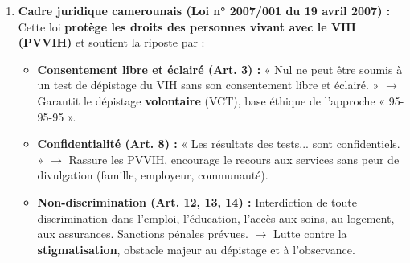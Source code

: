 \documentclass[11pt]{article}
\begin{document}
\begin{corrige}
\begin{enumerate}
\begin{enumerate}
\item \textbf{Dépistage communautaire et auto-test VIH (VIHAT) :} Déployer des \textbf{équipes mobiles} et \textbf{pairs-éducateurs} dans les lieux de vie des populations clés (HSH, travailleurs du sexe, usagers de drogues, jeunes, hommes) et zones rurales mal desservies. Proposer l'\textbf{auto-test VIH} (OraQuick, test salivaire) : confidentiel, non invasif, résultat en 20 min, réalisé par la personne elle-même. Cela lève les freins : stigmatisation en structure de santé, distance géographique, horaires incompatibles, peur du jugement. \emph{Preuve :} Projets ATLAS, STAR en Afrique subsaharienne ont doublé le taux de dépistage chez les hommes et populations clés.
\item \textbf{Dépistage index (partner notification) optimisé et linkage immédiat :} Pour \textbf{chaque nouveau cas diagnostiqué} au CTA, proposer systématiquement le dépistage aux \textbf{partenaires sexuels et enfants} (avec consentement, confidentialité, conseil). Assurer un \textbf{liaison (linkage) active} vers le CTA le jour même ou sous 7 jours : navigateur patient, rendez-vous programmé, accompagnement physique, suppression des frais utilisateurs (gratuité ARV + bilans). \emph{Contexte Cameroun :} Taux de linkage encore perfectible ($\sim 70-80\,\%$) ; perte de vue entre diagnostic et 1ère consultation ARV.
\end{enumerate}
\item \textbf{Cadre juridique camerounais (Loi n° 2007/001 du 19 avril 2007) :}
Cette loi \textbf{protège les droits des personnes vivant avec le VIH (PVVIH)} et soutient la riposte par :
\begin{itemize}
\item \textbf{Consentement libre et éclairé (Art. 3) :} « Nul ne peut être soumis à un test de dépistage du VIH sans son consentement libre et éclairé. » $\to$ Garantit le dépistage \textbf{volontaire} (VCT), base éthique de l'approche « 95-95-95 ».
\item \textbf{Confidentialité (Art. 8) :} « Les résultats des tests... sont confidentiels. » $\to$ Rassure les PVVIH, encourage le recours aux services sans peur de divulgation (famille, employeur, communauté).
\item \textbf{Non-discrimination (Art. 12, 13, 14) :} Interdiction de toute discrimination dans l'emploi, l'éducation, l'accès aux soins, au logement, aux assurances. Sanctions pénales prévues. $\to$ Lutte contre la \textbf{stigmatisation}, obstacle majeur au dépistage et à l'observance.

\end{itemize}
\end{enumerate}
\end{corrige}
\end{document}
